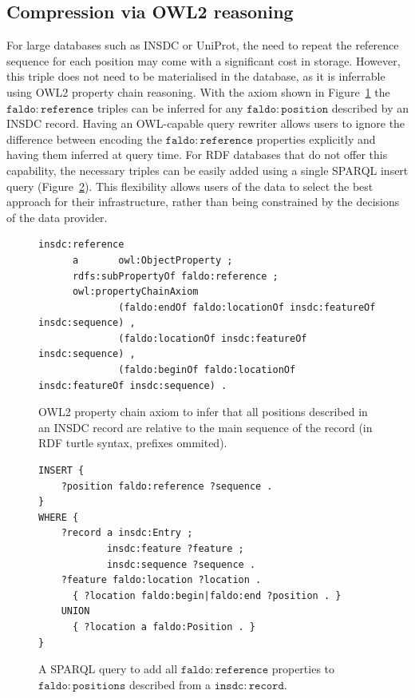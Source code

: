 \subsection*{Compression via OWL2 reasoning}
For large databases such as INSDC or UniProt,
the need to repeat the reference sequence for each position may come with a significant cost in storage.
However, this triple does not need to be materialised in the database, as it is inferrable using OWL2 property chain reasoning.
With the axiom shown in Figure~\ref{owl:chainProperty} the $\mathtt{faldo\colon{}reference}$ triples can be inferred for any $\mathtt{faldo\colon{}position}$ described by an INSDC record.
Having an OWL-capable query rewriter allows users to ignore the difference between encoding the $\mathtt{faldo\colon{}reference}$ properties explicitly and having them inferred at query time.
For RDF databases that do not offer this capability,
the necessary triples can be easily added using a single SPARQL insert query (Figure~\ref{sparql:chainProperty}).
This flexibility allows users of the data to select the best approach for their infrastructure, rather than being constrained by the decisions of the data provider.

\begin{figure}
\begin{shaded}
\small
\begin{verbatim}
insdc:reference
      a       owl:ObjectProperty ;
      rdfs:subPropertyOf faldo:reference ;
      owl:propertyChainAxiom
              (faldo:endOf faldo:locationOf insdc:featureOf insdc:sequence) , 
              (faldo:locationOf insdc:featureOf insdc:sequence) , 
              (faldo:beginOf faldo:locationOf insdc:featureOf insdc:sequence) .

\end{verbatim}
\end{shaded}
\caption{OWL2 property chain axiom to infer that all positions described in an INSDC record are relative to the main sequence of the record (in RDF turtle syntax, prefixes ommited).}
\label{owl:chainProperty}
\end{figure}

\begin{figure}
\begin{shaded}
\small
\begin{verbatim}
INSERT {
    ?position faldo:reference ?sequence .
}
WHERE {
    ?record a insdc:Entry ;
            insdc:feature ?feature ;
            insdc:sequence ?sequence .
    ?feature faldo:location ?location .
      { ?location faldo:begin|faldo:end ?position . }
    UNION
      { ?location a faldo:Position . }
}
\end{verbatim}
\end{shaded}
\caption{A SPARQL query to add all $\mathtt{faldo\colon{}reference}$ properties to $\mathtt{faldo\colon{}positions}$ described from a $\mathtt{insdc\colon{}record}$.}
\label{sparql:chainProperty}
\end{figure}

